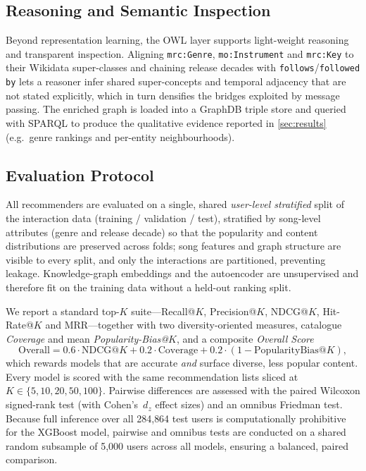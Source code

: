 \subsection{Reasoning and Semantic Inspection}

Beyond representation learning, the OWL layer supports light-weight reasoning
and transparent inspection. Aligning \texttt{mrc:Genre}, \texttt{mo:Instrument}
and \texttt{mrc:Key} to their Wikidata super-classes and chaining release
decades with \texttt{follows}/\texttt{followed by} lets a reasoner infer
shared super-concepts and temporal adjacency that are not stated explicitly,
which in turn densifies the bridges exploited by message passing. The enriched
graph is loaded into a GraphDB triple store and queried with SPARQL to produce
the qualitative evidence reported in \cref{sec:results} (e.g.\ genre rankings
and per-entity neighbourhoods).

\subsection{Evaluation Protocol}
\label{sec:eval-protocol}

All recommenders are evaluated on a single, shared \emph{user-level stratified}
split of the interaction data (training / validation / test), stratified by
song-level attributes (genre and release decade) so that the popularity and
content distributions are preserved across folds; song features and graph
structure are visible to every split, and only the interactions are
partitioned, preventing leakage. Knowledge-graph embeddings and the autoencoder
are unsupervised and therefore fit on the training data without a held-out
ranking split.

We report a standard top-$K$ suite---Recall@$K$, Precision@$K$, NDCG@$K$,
Hit-Rate@$K$ and MRR---together with two diversity-oriented measures,
catalogue \emph{Coverage} and mean \emph{Popularity-Bias@$K$}, and a composite
\emph{Overall Score}
\[
  \mathrm{Overall} = 0.6\cdot\mathrm{NDCG@}K
                   + 0.2\cdot\mathrm{Coverage}
                   + 0.2\cdot(1-\mathrm{PopularityBias@}K),
\]
which rewards models that are accurate \emph{and} surface diverse, less
popular content. Every model is scored with the same recommendation lists sliced at
$K\in\{5,10,20,50,100\}$. Pairwise differences are assessed with the
paired Wilcoxon signed-rank test (with Cohen's~$d_z$ effect sizes) and an
omnibus Friedman test. Because full inference over all 284{,}864 test users
is computationally prohibitive for the XGBoost model, pairwise and omnibus
tests are conducted on a shared random subsample of 5{,}000 users across all
models, ensuring a balanced, paired comparison.
